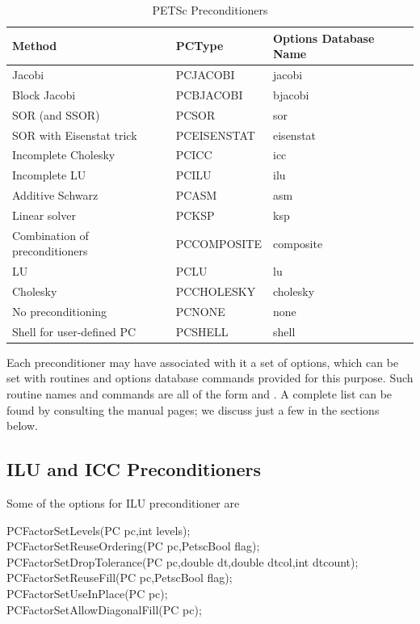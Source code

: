 \begin{table}
\begin{center}
\begin{tabular}{lll}
{\bf Method}    &{\bf PCType}   & {\bf Options Database Name}\\
\hline
Jacobi                               & PCJACOBI      & jacobi\\
Block Jacobi                         & PCBJACOBI     & bjacobi\\
SOR (and SSOR)                       & PCSOR         & sor\\
SOR with Eisenstat trick             & PCEISENSTAT   & eisenstat\\
Incomplete Cholesky                  & PCICC         & icc\\
Incomplete LU                        & PCILU         & ilu\\
Additive Schwarz                     & PCASM         & asm\\
Linear solver                        & PCKSP         & ksp \\
Combination of preconditioners       & PCCOMPOSITE   & composite \\
\hline
LU                                   & PCLU          & lu\\
Cholesky                             & PCCHOLESKY    & cholesky\\
No preconditioning                   & PCNONE        & none\\
Shell for user-defined PC            & PCSHELL       & shell\\
\hline
\end{tabular}
\end{center}
\caption{PETSc Preconditioners}
\label{tab_pcdefaults}
\end{table}

Each preconditioner may have associated with it a set of options,
which can be set with routines and options database commands provided
for this purpose.  Such routine names and commands are all of the form
 and .  A
complete list can be found by consulting the manual pages; we discuss
just a few in the sections below.

\subsection{ILU and ICC Preconditioners}
\label{sec_ilu_icc}

Some of the options for ILU preconditioner are 
\begin{tabbing}
  PCFactorSetLevels(PC pc,int levels);\\
  PCFactorSetReuseOrdering(PC pc,PetscBool  flag);\\
  PCFactorSetDropTolerance(PC pc,double dt,double dtcol,int dtcount);\\
  PCFactorSetReuseFill(PC pc,PetscBool  flag);\\
  PCFactorSetUseInPlace(PC pc); \\
  PCFactorSetAllowDiagonalFill(PC pc);
\end{tabbing}

